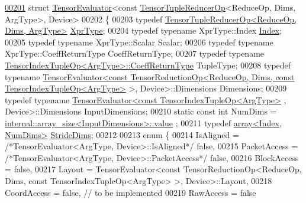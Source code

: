 \begin{DoxyCode}
\hyperlink{struct_eigen_1_1_tensor_evaluator_3_01const_01_tensor_tuple_reducer_op_3_01_reduce_op_00_01_dimsa9704c68eb01932857866cfd0005279c}{00201} \textcolor{keyword}{struct }\hyperlink{struct_eigen_1_1_tensor_evaluator}{TensorEvaluator}<const \hyperlink{class_eigen_1_1_tensor_tuple_reducer_op}{TensorTupleReducerOp}<ReduceOp, Dims, 
      ArgType>, Device>
00202 \{
00203   \textcolor{keyword}{typedef} \hyperlink{class_eigen_1_1_tensor_tuple_reducer_op}{TensorTupleReducerOp<ReduceOp, Dims, ArgType>} 
      \hyperlink{class_eigen_1_1_tensor_tuple_reducer_op}{XprType};
00204   \textcolor{keyword}{typedef} \textcolor{keyword}{typename} XprType::Index \hyperlink{namespace_eigen_a62e77e0933482dafde8fe197d9a2cfde}{Index};
00205   \textcolor{keyword}{typedef} \textcolor{keyword}{typename} XprType::Scalar Scalar;
00206   \textcolor{keyword}{typedef} \textcolor{keyword}{typename} XprType::CoeffReturnType CoeffReturnType;
00207   \textcolor{keyword}{typedef} \textcolor{keyword}{typename} \hyperlink{class_eigen_1_1_tensor_index_tuple_op}{TensorIndexTupleOp<ArgType>::CoeffReturnType}
       TupleType;
00208   \textcolor{keyword}{typedef} \textcolor{keyword}{typename} 
      \hyperlink{struct_eigen_1_1_tensor_evaluator}{TensorEvaluator<const TensorReductionOp<ReduceOp, Dims, const TensorIndexTupleOp<ArgType>}
       >, Device>::Dimensions Dimensions;
00209   \textcolor{keyword}{typedef} \textcolor{keyword}{typename} \hyperlink{struct_eigen_1_1_tensor_evaluator}{TensorEvaluator<const TensorIndexTupleOp<ArgType>}
       , Device>::Dimensions InputDimensions;
00210   \textcolor{keyword}{static} \textcolor{keyword}{const} \textcolor{keywordtype}{int} NumDims = \hyperlink{struct_eigen_1_1internal_1_1array__size}{internal::array\_size<InputDimensions>::value}
      ;
00211   \textcolor{keyword}{typedef} \hyperlink{class_eigen_1_1array}{array<Index, NumDims>} \hyperlink{class_eigen_1_1array}{StrideDims};
00212 
00213   \textcolor{keyword}{enum} \{
00214     IsAligned = \textcolor{comment}{/*TensorEvaluator<ArgType, Device>::IsAligned*/} \textcolor{keyword}{false},
00215     PacketAccess = \textcolor{comment}{/*TensorEvaluator<ArgType, Device>::PacketAccess*/} \textcolor{keyword}{false},
00216     BlockAccess = \textcolor{keyword}{false},
00217     Layout = TensorEvaluator<const TensorReductionOp<ReduceOp, Dims, const TensorIndexTupleOp<ArgType> >, 
      Device>::Layout,
00218     CoordAccess = \textcolor{keyword}{false},  \textcolor{comment}{// to be implemented}
00219     RawAccess = \textcolor{keyword}{false}

\end{DoxyCode}
